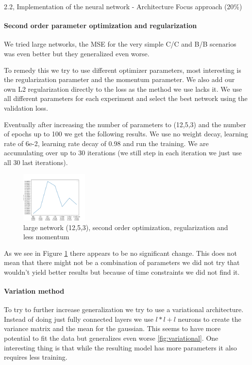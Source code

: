 \begin{task}{2.2, Implementation of the neural network - Architecture Focus approach (20\%)}
\paragraph{Second order parameter optimization and regularization}
We tried large networks, the MSE for the very simple C/C and B/B scenarios was even better but they generalized even worse.

To remedy this we try to use different optimizer parameters, most interesting is the regularization parameter and the momentum parameter. We also add our own L2 regularization directly to the loss as the method we use lacks it. We use all different parameters for each experiment and select the best network using the validation loss.

Eventually after increasing the number of parameters to (12,5,3) and the number of epochs up to 100 we get the following results. We use no weight decay, learning rate of 6e-2, learning rate decay of 0.98 and run the training. We are accumulating over up to 30 iterations (we still step in each iteration we just use all 30 last iterations).

\begin{figure}
\begin{center}
\includegraphics[width=0.3\textwidth]{images/12-5-3-0.05.png}
\end{center}
\caption{large network (12,5,3), second order optimization, regularization and less momentum}
\label{fig:regularization}
\end{figure}

As we see in Figure \ref{fig:regularization} there appears to be no significant change. This does not mean that there might not be a combination of parameters we did not try that wouldn't yield better results but because of time constraints we did not find it.

\paragraph{Variation method}
To try to further increase generalization we try to use a variational architecture. Instead of doing just fully connected layers we use $l*l+l$ neurons to create the variance matrix and the mean for the gaussian. This seems to have more potential to fit the data but generalizes even worse \ref{fig:variational}. One interesting thing is that while the resulting model has more parameters it also requires less training.


\end{task}
